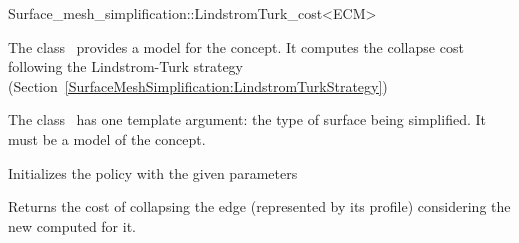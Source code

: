 

\begin{ccRefClass}{Surface_mesh_simplification::LindstromTurk_cost<ECM>}


\ccDefinition

The class \ccRefName\ provides a model for the  concept.
It computes the collapse cost following the Lindstrom-Turk strategy
(Section~\ref{SurfaceMeshSimplification:LindstromTurkStrategy})

The class \ccRefName\ has one template argument: the type of surface being simplified. 
It must be a model of the  concept.


\ccIsModel
{}

\ccCreation
{}  %
{Initializes the policy with the given parameters} 

  {Returns the cost of collapsing the edge (represented by its profile) considering 
  the new  computed for it.}

\ccSeeAlso
{}\\

\end{ccRefClass}


